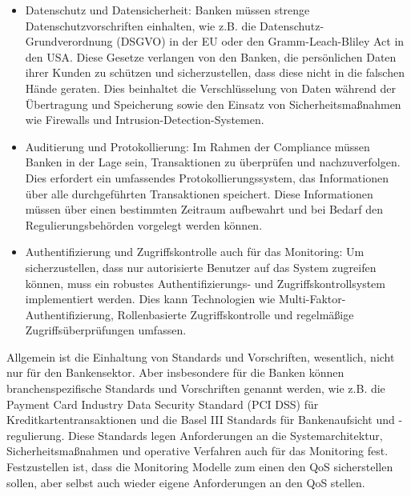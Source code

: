 \begin{itemize}
\item Datenschutz und Datensicherheit: Banken müssen strenge Datenschutzvorschriften einhalten, wie z.B. die Datenschutz-Grundverordnung (DSGVO) in der EU oder den Gramm-Leach-Bliley Act in den USA. Diese Gesetze verlangen von den Banken, die persönlichen Daten ihrer Kunden zu schützen und sicherzustellen, dass diese nicht in die falschen Hände geraten. Dies beinhaltet die Verschlüsselung von Daten während der Übertragung und Speicherung sowie den Einsatz von Sicherheitsmaßnahmen wie Firewalls und Intrusion-Detection-Systemen.
\item Auditierung und Protokollierung: Im Rahmen der Compliance müssen Banken in der Lage sein, Transaktionen zu überprüfen und nachzuverfolgen. Dies erfordert ein umfassendes Protokollierungssystem, das Informationen über alle durchgeführten Transaktionen speichert. Diese Informationen müssen über einen bestimmten Zeitraum aufbewahrt und bei Bedarf den Regulierungsbehörden vorgelegt werden können.
\item Authentifizierung und Zugriffskontrolle auch für das Monitoring: Um sicherzustellen, dass nur autorisierte Benutzer auf das System zugreifen können, muss ein robustes Authentifizierungs- und Zugriffskontrollsystem implementiert werden. Dies kann Technologien wie Multi-Faktor-Authentifizierung, Rollenbasierte Zugriffskontrolle und regelmäßige Zugriffsüberprüfungen umfassen.
\end{itemize}

Allgemein ist die Einhaltung von Standards und Vorschriften, wesentlich, nicht nur für den Bankensektor. Aber insbesondere für die Banken können branchenspezifische Standards und Vorschriften genannt werden, wie z.B. die Payment Card Industry Data Security Standard (PCI DSS) für Kreditkartentransaktionen und die Basel III Standards für Bankenaufsicht und -regulierung. Diese Standards legen Anforderungen an die Systemarchitektur, Sicherheitsmaßnahmen und operative Verfahren auch für das Monitoring fest. 
Festzustellen ist, dass die Monitoring Modelle zum einen den QoS sicherstellen sollen, aber selbst auch wieder eigene Anforderungen an den QoS stellen. 

